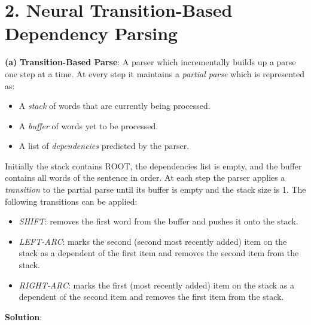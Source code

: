 \documentclass[10pt]{article}
\begin{document}
\newpage

\section*{2. Neural Transition-Based Dependency Parsing}
\label{sec:orgf1df58f}

\textbf{(a)} \textbf{Transition-Based Parse}: A parser which incrementally builds up a parse one step at a time. At every step it 
maintains a \emph{partial parse} which is represented as:

\begin{itemize}
\item A \emph{stack} of words that are currently being processed.
\item A \emph{buffer} of words yet to be processed.
\item A list of \emph{dependencies} predicted by the parser.
\end{itemize}

Initially the stack contains ROOT, the dependencies list is empty, and the buffer contains all words of the sentence 
in order. At each step the parser applies a \emph{transition} to the partial parse until its buffer is empty and the stack 
size is 1. The following transitions can be applied:

\begin{itemize}
\item \emph{SHIFT}: removes the first word from the buffer and pushes it onto the stack.
\item \emph{LEFT-ARC}: marks the second (second most recently added) item on the stack as a dependent of the first item and 
removes the second item from the stack.
\item \emph{RIGHT-ARC}: marks the first (most recently added) item on the stack as a dependent of the second item and removes
the first item from the stack.\\
\end{itemize}

\textbf{Solution}:
\end{document}
